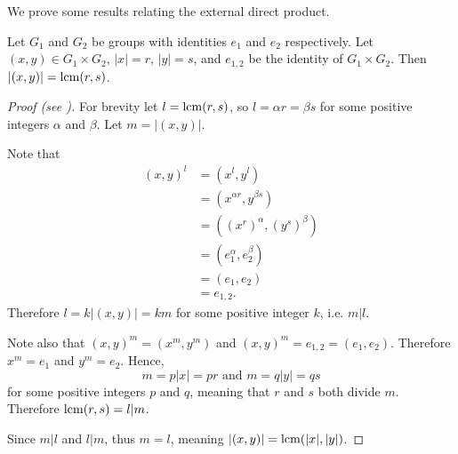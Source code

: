We prove some results relating the external direct product.
\begin{proposition}\label{prop-order-of-element-in-external-direct-product}
    Let $G_1$ and $G_2$ be groups with identities $e_1$ and $e_2$ respectively. Let $(x, y) \in G_1 \times G_2$, $|x| = r$, $|y| = s$, and $e_{1,2}$ be the identity of $G_1\times G_2$. Then $|(x, y)| = \mathrm{lcm}(r, s)$.
\end{proposition}
\begin{proof}[Proof (see \cite{proofwiki_orderofgroupelementinexternaldirectproduct})]
    For brevity let $l = \mathrm{lcm}(r, s)$, so $l = \alpha r = \beta s$ for some positive integers $\alpha$ and $\beta$. Let $m = |(x, y)|$.

    Note that
    \begin{align*}
        (x, y)^l &= (x^l, y^l)\\
        &= (x^{\alpha r}, y^{\beta s})\\
        &= \left((x^r)^\alpha, (y^s)^\beta\right)\\
        &= (e_1^\alpha, e_2^\beta)\\
        &= (e_1, e_2)\\
        &= e_{1,2}.
    \end{align*}
    Therefore $l = k|(x, y)| = km$ for some positive integer $k$, i.e. $m | l$.

    Note also that $(x, y)^m = (x^m, y^m)$ and $(x, y)^m = e_{1,2} = (e_1, e_2)$. Therefore $x^m = e_1$ and $y^m = e_2$. Hence,
    \[
        m = p|x| = pr \text{ and } m = q|y| = qs
    \]
    for some positive integers $p$ and $q$, meaning that $r$ and $s$ both divide $m$. Therefore $\mathrm{lcm}(r, s) = l | m$.

    Since $m | l$ and $l | m$, thus $m = l$, meaning $|(x, y)| = \mathrm{lcm}(|x|, |y|)$.
\end{proof}

